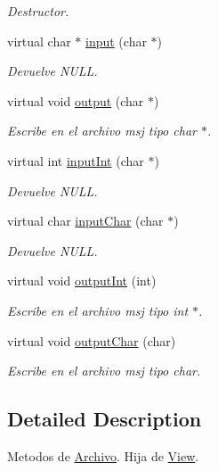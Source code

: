 \begin{DoxyCompactItemize}
\begin{DoxyCompactList}\small\item\em Destructor. \end{DoxyCompactList}\item 
virtual char $\ast$ \hyperlink{class_archivo_ae92d946bce2234d8afd4cbd66f17a120}{input} (char $\ast$)
\begin{DoxyCompactList}\small\item\em Devuelve N\+U\+LL. \end{DoxyCompactList}\item 
virtual void \hyperlink{class_archivo_ad90221331fb1b3546e15158338c2b789}{output} (char $\ast$)
\begin{DoxyCompactList}\small\item\em Escribe en el archivo msj tipo char $\ast$. \end{DoxyCompactList}\item 
virtual int \hyperlink{class_archivo_a5489d20a947004f39885d42bb794b4c1}{input\+Int} (char $\ast$)
\begin{DoxyCompactList}\small\item\em Devuelve N\+U\+LL. \end{DoxyCompactList}\item 
virtual char \hyperlink{class_archivo_a5deafd974e4ed6f6416576c1076c0de8}{input\+Char} (char $\ast$)
\begin{DoxyCompactList}\small\item\em Devuelve N\+U\+LL. \end{DoxyCompactList}\item 
virtual void \hyperlink{class_archivo_acacb6d58f33e9c962b4cc8f8fb27703f}{output\+Int} (int)
\begin{DoxyCompactList}\small\item\em Escribe en el archivo msj tipo int $\ast$. \end{DoxyCompactList}\item 
virtual void \hyperlink{class_archivo_a46ab06b1dd4e3fc59b8bfc28c6ad3f3a}{output\+Char} (char)
\begin{DoxyCompactList}\small\item\em Escribe en el archivo msj tipo char. \end{DoxyCompactList}\end{DoxyCompactItemize}


\subsection{Detailed Description}
Metodos de \hyperlink{class_archivo}{Archivo}. Hija de \hyperlink{class_view}{View}. 

